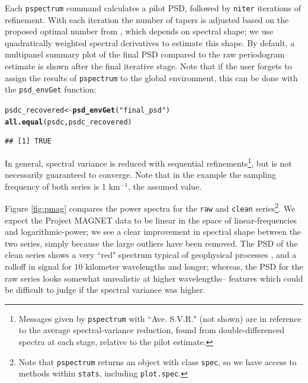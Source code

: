 \documentclass{article}\usepackage{graphicx, color}
\makeatletter
\newcommand{\hlfunctioncall}[1]{\textcolor[rgb]{0.501960784313725,0,0.329411764705882}{\textbf{#1}}}%
\newcommand{\hlstring}[1]{\textcolor[rgb]{0.6,0.6,1}{#1}}%
\newenvironment{kframe}{%
 \def\at@end@of@kframe{}%
 \ifinner\ifhmode%
  \def\at@end@of@kframe{\end{minipage}}%
  \begin{minipage}{\columnwidth}%
 \fi\fi%
 \def\FrameCommand##1{\hskip\@totalleftmargin \hskip-\fboxsep
 \colorbox{shadecolor}{##1}\hskip-\fboxsep
     \hskip-\linewidth \hskip-\@totalleftmargin \hskip\columnwidth}%
 \MakeFramed {\advance\hsize-\width
   \@totalleftmargin\z@ \linewidth\hsize
   \@setminipage}}%
 {\par\unskip\endMakeFramed%
 \at@end@of@kframe}
\newenvironment{knitrout}{}{} %
\newcommand{\Rcmd}[1]{\texttt{#1}}
\makeatother
\begin{document}
Each  \Rcmd{pspectrum} command calculates a pilot PSD, followed by 
\Rcmd{niter}
iterations of refinement.
With each iteration
the number of tapers is adjusted 
based on the proposed optimal number from \citet{rs1995}, which
depends on spectral shape; we use 
quadratically weighted spectral derivatives \citep{prieto2007}
to estimate this shape.
By default, a multipanel summary plot of the final PSD compared
to the raw periodogram estimate is shown after the final iterative stage.
Note that if the user forgets to assign the results of
\Rcmd{pspectrum} to the global environment, this can be
done with the \Rcmd{psd\_envGet} function:
\begin{knitrout}
\color{fgcolor}\begin{kframe}
\begin{alltt}
psdc_recovered <- \hlfunctioncall{psd_envGet}(\hlstring{"final_psd"})
\hlfunctioncall{all.equal}(psdc, psdc_recovered)
\end{alltt}
\begin{verbatim}
## [1] TRUE
\end{verbatim}
\end{kframe}
\end{knitrout}


In general, spectral variance is reduced
with sequential refinements\footnote{
Messages given by \Rcmd{pspectrum} with
``Ave. S.V.R."  (not shown)
are in reference to the 
 average spectral-variance reduction, found from
 double-differenced spectra at each stage, relative
 to the pilot estimate.
}, but is not necessarily guaranteed to converge.
Note that in the example
the sampling frequency of both series
is 1 km$^{-1}$, the assumed value.

Figure \ref{fig:pmag} compares the 
power spectra for the \Rcmd{raw} and \Rcmd{clean} 
series\footnote{
Note that \Rcmd{pspectrum} returns
an object with class \Rcmd{spec}, so we have access to methods 
within \Rcmd{stats}, including \Rcmd{plot.spec}.
}.  
We expect the Project MAGNET data to be linear in the space of
linear-frequencies and logarithmic-power;
we see a clear
improvement in spectral shape between the two series,
simply because the large outliers have been removed.
The PSD of the clean series shows a
very ``red" spectrum typical of geophysical processes \citep{agnew1992},
and a rolloff in signal
for 10 kilometer wavelengths and longer; whereas, the 
PSD for the raw series looks somewhat unrealistic at higher wavelengths--
features which could be difficult to judge if the spectral variance was higher.
\end{document}
